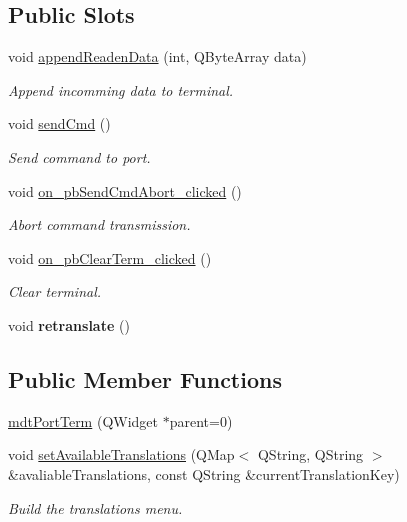 \subsection*{Public Slots}
\begin{DoxyCompactItemize}
\item 
void \hyperlink{classmdt_port_term_aaf0e6b8d2416bf2859fdfd9a851523b8}{appendReadenData} (int, QByteArray data)
\begin{DoxyCompactList}\small\item\em Append incomming data to terminal. \end{DoxyCompactList}\item 
void \hyperlink{classmdt_port_term_a7ec568c44f862fe7aee83f1a271ac6bb}{sendCmd} ()
\begin{DoxyCompactList}\small\item\em Send command to port. \end{DoxyCompactList}\item 
void \hyperlink{classmdt_port_term_a1b232e686b401d7103eb1c682be330a9}{on\_\-pbSendCmdAbort\_\-clicked} ()
\begin{DoxyCompactList}\small\item\em Abort command transmission. \end{DoxyCompactList}\item 
\hypertarget{classmdt_port_term_abb3fc55837782dbea240b069a48b18ce}{
void \hyperlink{classmdt_port_term_abb3fc55837782dbea240b069a48b18ce}{on\_\-pbClearTerm\_\-clicked} ()}
\label{classmdt_port_term_abb3fc55837782dbea240b069a48b18ce}

\begin{DoxyCompactList}\small\item\em Clear terminal. \end{DoxyCompactList}\item 
\hypertarget{classmdt_port_term_a542e20f789bcdc5f2ddf2b6e698ceea2}{
void {\bfseries retranslate} ()}
\label{classmdt_port_term_a542e20f789bcdc5f2ddf2b6e698ceea2}

\end{DoxyCompactItemize}
\subsection*{Public Member Functions}
\begin{DoxyCompactItemize}
\item 
\hyperlink{classmdt_port_term_a5e93890f53b5112be80983779a3ab233}{mdtPortTerm} (QWidget $\ast$parent=0)
\item 
\hypertarget{classmdt_port_term_a9e2987c96c85189ce118aab7af77fb71}{
void \hyperlink{classmdt_port_term_a9e2987c96c85189ce118aab7af77fb71}{setAvailableTranslations} (QMap$<$ QString, QString $>$ \&avaliableTranslations, const QString \&currentTranslationKey)}
\label{classmdt_port_term_a9e2987c96c85189ce118aab7af77fb71}

\begin{DoxyCompactList}\small\item\em Build the translations menu. \end{DoxyCompactList}\end{DoxyCompactItemize}



